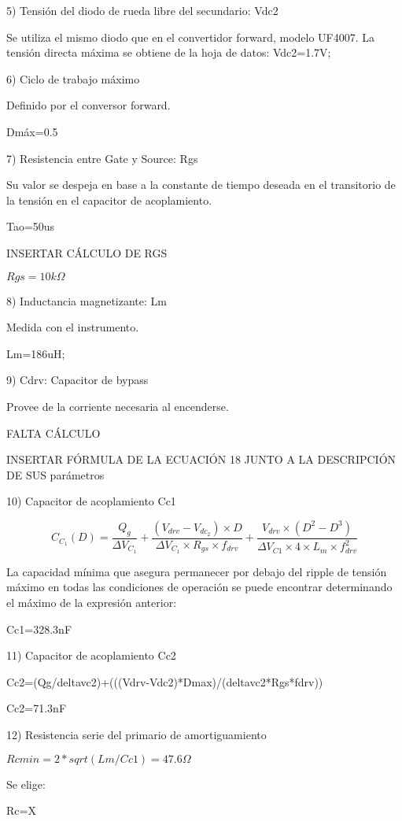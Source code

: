 5) Tensión del diodo de rueda libre del secundario: Vdc2

Se utiliza el mismo diodo que en el convertidor forward, modelo UF4007. 
La tensión directa máxima se obtiene de la hoja de datos: 
Vdc2=1.7V;

6) Ciclo de trabajo máximo 

Definido por el conversor forward.

Dmáx=0.5

7) Resistencia entre Gate y Source: Rgs

Su valor se despeja en base a la constante de tiempo deseada en el transitorio de la tensión en el capacitor de acoplamiento.

Tao=50us

INSERTAR CÁLCULO DE RGS

$Rgs=10k\Omega$

8) Inductancia magnetizante: Lm

Medida con el instrumento. 

Lm=186uH;

9) Cdrv: Capacitor de bypass

Provee de la corriente necesaria al encenderse. 

FALTA CÁLCULO

INSERTAR FÓRMULA DE LA ECUACIÓN 18 JUNTO A LA DESCRIPCIÓN DE SUS parámetros

10) Capacitor de acoplamiento Cc1

$$ C_{C_1}(D)=\frac{Q_g}{\Delta V_{C_1}}+\frac{(V_{drv}-V_{{dc}_2})\times D}{\Delta V_{C_1}\times R_{gs}\times f_{drv}}+\frac{V_{drv}\times (D^2-D^3)}{\Delta V_{C1}\times 4\times L_m\times f_{drv}^2} $$

La capacidad mínima que asegura permanecer por debajo del ripple de tensión máximo en todas las condiciones de operación 
se puede encontrar determinando el máximo de la expresión anterior:

Cc1=328.3nF

11) Capacitor de acoplamiento Cc2

Cc2=(Qg/deltavc2)+(((Vdrv-Vdc2)*Dmax)/(deltavc2*Rgs*fdrv))

Cc2=71.3nF

12) Resistencia serie del primario de amortiguamiento

$Rcmin=2*sqrt(Lm/Cc1)=47.6\Omega$

Se elige:

Rc=X